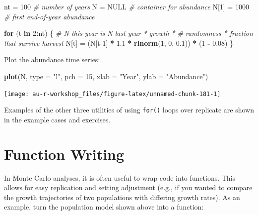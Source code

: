 \documentclass[]{book}
\newenvironment{Shaded}{\begin{snugshade}}{\end{snugshade}}
\newcommand{\CommentTok}[1]{\textcolor[rgb]{0.56,0.35,0.01}{\textit{#1}}}
\newcommand{\ControlFlowTok}[1]{\textcolor[rgb]{0.13,0.29,0.53}{\textbf{#1}}}
\newcommand{\DataTypeTok}[1]{\textcolor[rgb]{0.13,0.29,0.53}{#1}}
\newcommand{\DecValTok}[1]{\textcolor[rgb]{0.00,0.00,0.81}{#1}}
\newcommand{\FloatTok}[1]{\textcolor[rgb]{0.00,0.00,0.81}{#1}}
\newcommand{\KeywordTok}[1]{\textcolor[rgb]{0.13,0.29,0.53}{\textbf{#1}}}
\newcommand{\NormalTok}[1]{#1}
\newcommand{\OperatorTok}[1]{\textcolor[rgb]{0.81,0.36,0.00}{\textbf{#1}}}
\newcommand{\OtherTok}[1]{\textcolor[rgb]{0.56,0.35,0.01}{#1}}
\newcommand{\StringTok}[1]{\textcolor[rgb]{0.31,0.60,0.02}{#1}}
\begin{document}
\begin{Shaded}
\begin{Highlighting}[]
\NormalTok{nt =}\StringTok{ }\DecValTok{100}       \CommentTok{# number of years}
\NormalTok{N =}\StringTok{ }\OtherTok{NULL}       \CommentTok{# container for abundance}
\NormalTok{N[}\DecValTok{1}\NormalTok{] =}\StringTok{ }\DecValTok{1000}    \CommentTok{# first end-of-year abundance}

\ControlFlowTok{for}\NormalTok{ (t }\ControlFlowTok{in} \DecValTok{2}\OperatorTok{:}\NormalTok{nt) \{}
  \CommentTok{# N this year is N last year * growth *}
    \CommentTok{# randomness * fraction that survive harvest}
\NormalTok{  N[t] =}\StringTok{ }\NormalTok{(N[t}\DecValTok{-1}\NormalTok{] }\OperatorTok{*}\StringTok{ }\FloatTok{1.1} \OperatorTok{*}\StringTok{ }\KeywordTok{rlnorm}\NormalTok{(}\DecValTok{1}\NormalTok{, }\DecValTok{0}\NormalTok{, }\FloatTok{0.1}\NormalTok{)) }\OperatorTok{*}\StringTok{ }\NormalTok{(}\DecValTok{1} \OperatorTok{-}\StringTok{ }\FloatTok{0.08}\NormalTok{)}
\NormalTok{\}}
\end{Highlighting}
\end{Shaded}

Plot the abundance time series:

\begin{Shaded}
\begin{Highlighting}[]
\KeywordTok{plot}\NormalTok{(N, }\DataTypeTok{type =} \StringTok{"l"}\NormalTok{, }\DataTypeTok{pch =} \DecValTok{15}\NormalTok{, }\DataTypeTok{xlab =} \StringTok{"Year"}\NormalTok{, }\DataTypeTok{ylab =} \StringTok{"Abundance"}\NormalTok{)}
\end{Highlighting}
\end{Shaded}

\begin{center}\texttt{[image: au-r-workshop\_files/figure-latex/unnamed-chunk-181-1]} \end{center}

Examples of the other three utilities of using \texttt{for()} loops over replicate are shown in the example cases and exercises.

\hypertarget{adv-funcs}{%
\section{Function Writing}\label{adv-funcs}}

In Monte Carlo analyses, it is often useful to wrap code into functions. This allows for easy replication and setting adjustment (e.g., if you wanted to compare the growth trajectories of two populations with differing growth rates). As an example, turn the population model shown above into a function:
\end{document}
